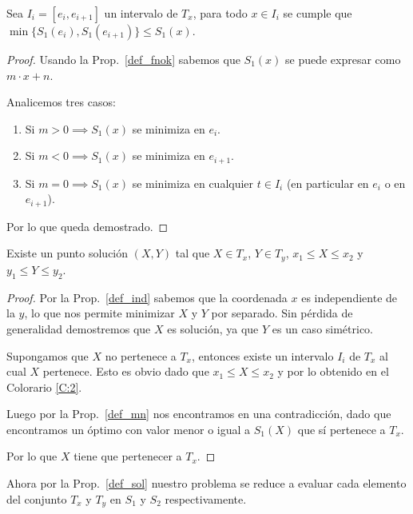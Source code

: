 \begin{proposition}
    Sea $I_i = [e_i, e_{i+1}]$ un intervalo de $T_x$, para todo $x \in I_i$ se cumple que $\min \{ S_1(e_i), S_1(e_{i+1}) \} \le S_1(x)$.
    \label{def_mn}
\end{proposition}

\begin{proof}
    Usando la Prop.~\ref{def_fnok} sabemos que $S_1(x)$ se puede expresar como $m \cdot x + n$.

    Analicemos tres casos:

    \begin{enumerate}
        \item Si $m > 0 \implies S_1(x)$ se minimiza en $e_i$.
        \item Si $m < 0 \implies S_1(x)$ se minimiza en $e_{i+1}$.
        \item Si $m = 0 \implies S_1(x)$ se minimiza en cualquier $t \in I_i$ (en particular en $e_i$ o en $e_{i+1}$).
    \end{enumerate}

    Por lo que queda demostrado.
\end{proof}

\begin{proposition}
    Existe un punto solución $(X, Y)$ tal que $X \in T_x$, $Y \in T_y$, $x_1 \le X \le x_2$ y $y_1 \le Y \le y_2$.
    \label{def_sol}
\end{proposition}

\begin{proof}
    \hfill

    Por la Prop.~\ref{def_ind} sabemos que la coordenada $x$ es independiente de la $y$, lo que nos permite minimizar $X$ y $Y$ por separado. Sin pérdida de generalidad demostremos que $X$ es solución, ya que $Y$ es un caso simétrico.
    
    Supongamos que $X$ no pertenece a $T_x$, entonces existe un intervalo $I_i$ de $T_x$ al cual $X$ pertenece. Esto es obvio dado que $x_1 \le X \le x_2$ y por lo obtenido en el Colorario \ref{C:2}.
    
    Luego por la Prop.~\ref{def_mn} nos encontramos en una contradicción, dado que encontramos un óptimo con valor menor o igual a $S_1(X)$ que sí pertenece a $T_x$.
    
    Por lo que $X$ tiene que pertenecer a $T_x$.
\end{proof}

Ahora por la Prop.~\ref{def_sol} nuestro problema se reduce a evaluar cada elemento del conjunto $T_x$ y $T_y$ en $S_1$ y $S_2$ respectivamente.

